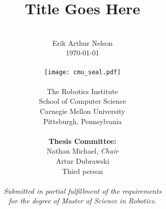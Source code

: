 \author{
  \\
        Erik Arthur Nelson \\
        \today \\
  \\
        \texttt{[image: cmu\_seal.pdf]}
  \\
  \\
        The Robotics Institute \\
        School of Computer Science \\
        Carnegie Mellon University \\
        Pittsburgh, Pennsylvania \\
  \\
        {\bf Thesis Committee:} \\
        Nathan Michael, {\it Chair} \\
        Artur Dubrawski \\
        Third person \\
  \\
        \textit{Submitted in partial fulfillment of the requirements} \\
        \textit{for the degree of Master of Science in Robotics.}
}

\title{\bf{
  Title Goes Here
}}

\date{}
